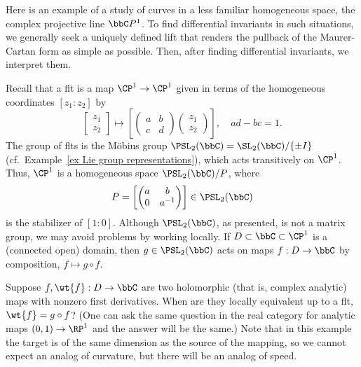 \begin{example}
    Here is an example of a study of curves in a less familiar homogeneous space, the complex projective line $\bbC  P^1$. To find differential invariants in such situations, we generally seek a uniquely defined lift that renders the pullback of the Maurer-Cartan form as simple as possible. Then, after finding differential invariants, we interpret them.

    Recall that a \gls{flt} is a map $\CP^1\to \CP^1$ given in terms of the homogeneous coordinates $[z_1:z_2]$ by 
    \[
        \begin{bmatrix}
            z_1\\z_2
        \end{bmatrix}
        \mapsto \left[\begin{pmatrix}
            a & b\\
            c& d
        \end{pmatrix}
        \begin{pmatrix}
            z_1\\z_2
        \end{pmatrix}\right],\quad ad-bc=1.
    \]
    The group of \glspl{flt} is the M\"obius group $\PSL_2(\bbC)=\SL_2(\bbC)\slash \{\pm I\}$ (cf.\ Example~\ref{ex Lie group representations}), which acts transitively on $\CP^1$.  Thus, $\CP^1$ is a homogeneous space $\PSL_2(\bbC)\slash P$, where 
    \[P=\left[
        \begin{pmatrix}
            a & b \\
            0 & a^{-1}
        \end{pmatrix}
    \right]\in\PSL_2(\bbC)\]
    is the stabilizer of $[1:0]$. Although $\PSL_2(\bbC)$, as presented, is not a matrix group, we may avoid problems by working locally. If $D\subset \bbC\subset\CP^1$ is a (connected open) domain, then $g\in\PSL_2(\bbC)$ acts on maps $f:D\to \bbC$ by composition, $f\mapsto g\circ f$.

    Suppose $f,\wt{f}:D\to \bbC$ are two holomorphic (that is, complex analytic) maps with nonzero first derivatives. When are they locally equivalent up to a \gls{flt}, $\wt{f}=g\circ f$? (One can ask the same question in the real category for analytic maps $(0,1)\to \RP^1$ and the answer will be the same.) Note that in this example the target is of the same dimension as the source of the mapping, so we cannot expect an analog of curvature, but there will be an analog of speed.


\end{example}
